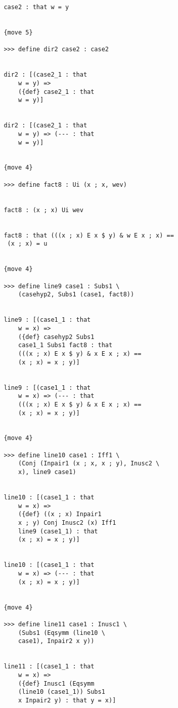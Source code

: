\documentclass[12pt]{article}
\begin{document}
\begin{verbatim}
               case2 : that w = y


               {move 5}

               >>> define dir2 case2 : case2


               dir2 : [(case2_1 : that 
                   w = y) => 
                   ({def} case2_1 : that 
                   w = y)]


               dir2 : [(case2_1 : that 
                   w = y) => (--- : that 
                   w = y)]


               {move 4}

               >>> define fact8 : Ui (x ; x, wev)


               fact8 : (x ; x) Ui wev


               fact8 : that (((x ; x) E x $ y) & w E x ; x) == 
                (x ; x) = u


               {move 4}

               >>> define line9 case1 : Subs1 \
                   (casehyp2, Subs1 (case1, fact8))


               line9 : [(case1_1 : that 
                   w = x) => 
                   ({def} casehyp2 Subs1 
                   case1_1 Subs1 fact8 : that 
                   (((x ; x) E x $ y) & x E x ; x) == 
                   (x ; x) = x ; y)]


               line9 : [(case1_1 : that 
                   w = x) => (--- : that 
                   (((x ; x) E x $ y) & x E x ; x) == 
                   (x ; x) = x ; y)]


               {move 4}

               >>> define line10 case1 : Iff1 \
                   (Conj (Inpair1 (x ; x, x ; y), Inusc2 \
                   x), line9 case1)


               line10 : [(case1_1 : that 
                   w = x) => 
                   ({def} ((x ; x) Inpair1 
                   x ; y) Conj Inusc2 (x) Iff1 
                   line9 (case1_1) : that 
                   (x ; x) = x ; y)]


               line10 : [(case1_1 : that 
                   w = x) => (--- : that 
                   (x ; x) = x ; y)]


               {move 4}

               >>> define line11 case1 : Inusc1 \
                   (Subs1 (Eqsymm (line10 \
                   case1), Inpair2 x y))


               line11 : [(case1_1 : that 
                   w = x) => 
                   ({def} Inusc1 (Eqsymm 
                   (line10 (case1_1)) Subs1 
                   x Inpair2 y) : that y = x)]



\end{verbatim}
\end{document}
